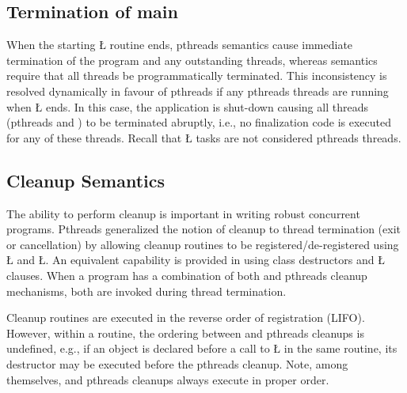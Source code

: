 \documentclass[openright,twoside]{report}
\begin{document}
\subsection{\texorpdfstring{Termination of {\BGfont main}}{Termination of main}}

When the starting \LGinlinetrue\LGbegin\lgrinde\L{}\endlgrinde\LGend{} routine ends, pthreads semantics cause immediate termination of the program and any outstanding threads, whereas \uC semantics require that all threads be programmatically terminated.
This inconsistency is resolved dynamically in favour of pthreads if any pthreads threads are running when \LGinlinetrue\LGbegin\lgrinde\L{}\endlgrinde\LGend{} ends.
In this case, the application is shut-down causing all threads (pthreads and \uC) to be terminated abruptly, i.e., no finalization code is executed for any of these threads.
Recall that \LGinlinetrue\LGbegin\lgrinde\L{}\endlgrinde\LGend{} tasks are not considered pthreads threads. 


\subsection{Cleanup Semantics}

The ability to perform cleanup is important in writing robust concurrent programs.
Pthreads generalized the notion of cleanup to thread termination (exit or cancellation) by allowing cleanup routines to be registered/de-registered using \LGinlinetrue\LGbegin\lgrinde\L{}\endlgrinde\LGend{} and \LGinlinetrue\LGbegin\lgrinde\L{}\endlgrinde\LGend{}.
An equivalent capability is provided in \CC using class destructors and \LGinlinetrue\LGbegin\lgrinde\L{}\endlgrinde\LGend{} clauses.
When a \uC program has a combination of both \CC and pthreads cleanup mechanisms, both are invoked during thread termination.

Cleanup routines are executed in the reverse order of registration (LIFO).
However, within a routine, the ordering between \CC and pthreads cleanups is undefined, e.g., if an object is declared before a call to \LGinlinetrue\LGbegin\lgrinde\L{}\endlgrinde\LGend{} in the same routine, its destructor may be executed before the pthreads cleanup.
Note, among themselves, \CC and pthreads cleanups always execute in proper order.
\end{document}
